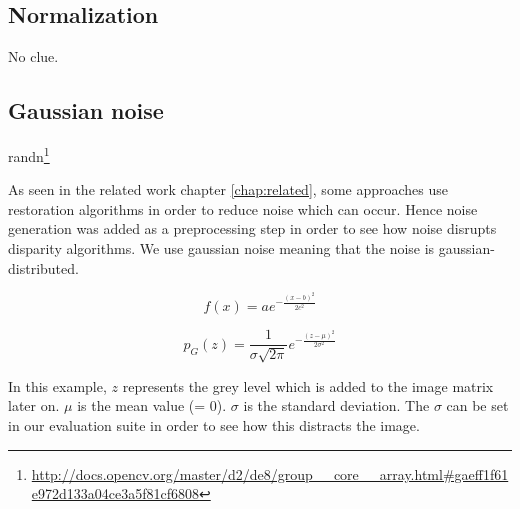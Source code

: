 \subsection*{Normalization}

No clue.

\subsection*{Gaussian noise}

randn\footnote{\url{http://docs.opencv.org/master/d2/de8/group__core__array.html\#gaeff1f61e972d133a04ce3a5f81cf6808}}


\citep{opencv_library}

As seen in the related work chapter \ref{chap:related}, some approaches use restoration algorithms in order to reduce noise which can occur.
Hence noise generation was added as a preprocessing step in order to see how noise disrupts disparity algorithms.
We use gaussian noise meaning that the noise is gaussian-distributed.

$$f\left(x\right) = a e^{- { \frac{(x-b)^2 }{ 2 c^2} } }$$

$$p_G(z) = \frac{1}{\sigma\sqrt{2\pi}} e^{ -\frac{(z-\mu)^2}{2\sigma^2} }$$

\noindent In this example, $z$ represents the grey level which is added to the image matrix later on.
$\mu$ is the mean value (= 0).
$\sigma$ is the standard deviation.
\newline\newline\noindent The $\sigma$ can be set in our evaluation suite in order to see how this distracts the image.


\begin{figure}[h!]
\center
{}
\end{figure}

